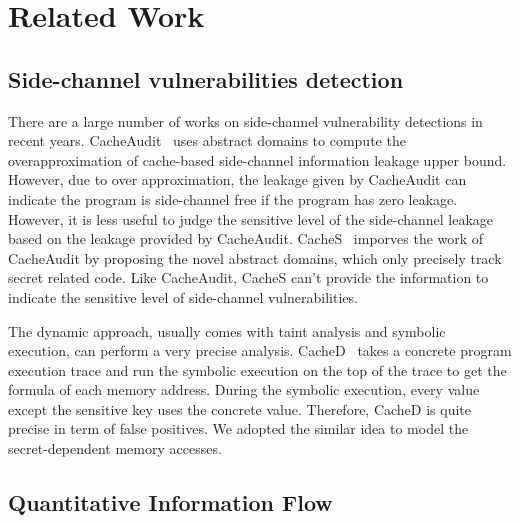 \section{Related Work}
\subsection{Side-channel vulnerabilities detection}

There are a large number of works on side-channel vulnerability detections in recent years.
CacheAudit~\cite{182946} uses abstract domains to compute the overapproximation of cache-based
side-channel information leakage upper bound. However, due to over approximation, the leakage
given by CacheAudit can indicate the program is side-channel free if the program has zero leakage. 
However, it is less useful to judge the sensitive level of the side-channel leakage based on the
leakage provided by CacheAudit. CacheS~\cite{236338} imporves the work of CacheAudit by proposing 
the novel abstract domains, which only precisely track secret related code. Like CacheAudit, CacheS
can't provide the information to indicate the sensitive level of side-channel vulnerabilities.

The dynamic approach, usually comes with taint analysis and symbolic execution, can perform a very 
precise analysis. CacheD~\cite{203878} takes a concrete program execution trace and run the symbolic
execution on the top of the trace to get the formula of each memory address. During the symbolic
execution, every value except the sensitive key uses the concrete value. Therefore, CacheD is quite 
precise in term of false positives. We adopted the similar idea to model the  secret-dependent memory 
accesses.  
\subsection{Quantitative Information Flow}
